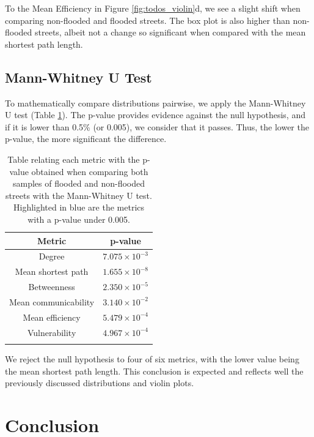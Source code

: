 \documentclass[sn-nature]{sn-jnl}%
\theoremstyle{thmstyleone}%
\theoremstyle{thmstyletwo}%
\theoremstyle{thmstylethree}%
\begin{document}
To the Mean Efficiency in Figure \ref{fig:todos_violin}d, we see a slight shift when comparing non-flooded and flooded streets. The box plot is also higher than non-flooded streets, albeit not a change so significant when compared with the mean shortest path length.

\subsection{Mann-Whitney U Test}

To mathematically compare distributions pairwise, we apply the Mann-Whitney U test (Table \ref{tbl:mwu}). The p-value provides evidence against the null hypothesis, and if it is lower than 0.5\% (or 0.005), we consider that it passes. Thus, the lower the p-value, the more significant the difference.

\begin{table}[H]
\centering
\caption{Table relating each metric with the p-value obtained when comparing both samples of flooded and non-flooded streets with the Mann-Whitney U test. Highlighted in blue are the metrics with a p-value under 0.005.}\label{tbl:mwu}
\begin{tabular}{c|c}
\toprule
Metric                             & p-value  \\
\midrule
Degree                             & $7.075\times10^{-3}$ \\
\rowcolor{LightCyan}
Mean shortest path                 & $1.655\times10^{-8}$ \\
\rowcolor{LightCyan}
Betweenness                        & $2.350\times10^{-5}$ \\
Mean communicability               & $3.140\times10^{-2}$ \\
\rowcolor{LightCyan}
Mean efficiency                    & $5.479\times10^{-4}$ \\
\rowcolor{LightCyan}
Vulnerability & $4.967\times10^{-4}$\\
\botrule
\end{tabular}
\end{table}

We reject the null hypothesis to four of six metrics, with the lower value being the mean shortest path length. This conclusion is expected and reflects well the previously discussed distributions and violin plots.

\section{Conclusion}\label{sec13}
\label{ch:conclusions}
\end{document}
